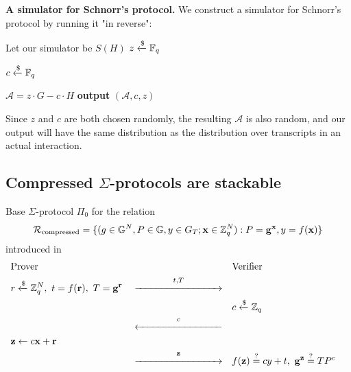 \textbf{A simulator for Schnorr's protocol.} We construct a simulator for Schnorr's protocol by running it "in reverse":

\begin{center}
    \begin{problem}[width=\linewidth/2]{Let our simulator be $S(H)$}
    $z \xleftarrow{\$} \mathbb{F}_q$ 
    
    $c \xleftarrow{\$} \mathbb{F}_q$
    
    $\mathcal A = z \cdot G - c \cdot H$
    \tcblower
    \textbf{output} $(\mathcal A,c,z)$
    \end{problem}
\end{center}

Since $z$ and $c$ are both chosen randomly, the resulting $\mathcal A$ is also random, and our output will have the same distribution as the distribution over transcripts in an actual interaction.

\subsection{Compressed $\Sigma$-protocols are stackable}
\begin{protocol}[]{Base $\Sigma$-protocol $\Pi_0$ for the relation 
$$\mathcal R_{\text{compressed}} = \{(g \in \mathbb{G}^N, P \in \mathbb{G}, y \in G_T; \mathbf{x} \in \mathbb{Z}_q^N): P = \mathbf{g^x}, y = f(\mathbf{x})\}$$ introduced in \cite{attema}} 
   \vspace{-0.5cm}
   \begin{align*}
       &\text{Prover}& 
       &&
       &\text{Verifier}& 
       \\
       &r \samplefrom \Z_q^N,\ t = f(\mathbf{r}),\ T = \mathbf{g^r}&
       &\overset  {t, T} {\xrightarrow{\hspace{3cm}}}&
       && 
       \\
       &&
       &&
       &c \samplefrom \Z_q&
       \\
       &&
       &\overset c {\xleftarrow{\hspace{3cm}}}&
       &&
       \\
       &\mathbf{z} \leftarrow c\mathbf{x} + \mathbf{r}&
       &&
       &&
       \\
       &&
       &\overset {\mathbf{z}} {\xrightarrow{\hspace{3cm}}}&
       &f(\mathbf{z}) \verify cy + t, \ \mathbf{g^z} \verify TP^c&
   \end{align*}
   \label{prot:base-compressed}
\end{protocol}